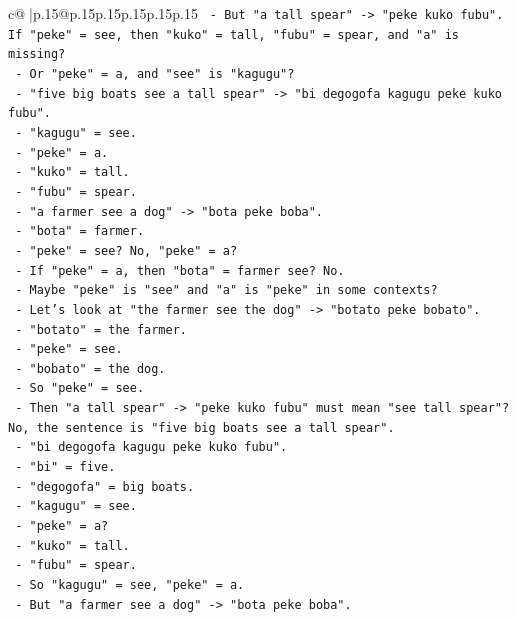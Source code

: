 \documentclass{article}
\begin{document}
{\begin{supertabular}{c@{$\;$}|p{.15\linewidth}@{}p{.15\linewidth}p{.15\linewidth}p{.15\linewidth}p{.15\linewidth}p{.15\linewidth}}
{{{\texttt{        {-} But "a tall spear" {-}> "peke kuko fubu". If "peke" = see, then "kuko" = tall, "fubu" = spear, and "a" is missing?} \\
\texttt{        {-} Or "peke" = a, and "see" is "kagugu"?} \\
\texttt{        {-} "five big boats see a tall spear" {-}> "bi degogofa kagugu peke kuko fubu".} \\
\texttt{        {-} "kagugu" = see.} \\
\texttt{        {-} "peke" = a.} \\
\texttt{        {-} "kuko" = tall.} \\
\texttt{        {-} "fubu" = spear.} \\
\texttt{        {-} "a farmer see a dog" {-}> "bota peke boba".} \\
\texttt{        {-} "bota" = farmer.} \\
\texttt{        {-} "peke" = see? No, "peke" = a?} \\
\texttt{        {-} If "peke" = a, then "bota" = farmer see? No.} \\
\texttt{        {-} Maybe "peke" is "see" and "a" is "peke" in some contexts?} \\
\texttt{        {-} Let's look at "the farmer see the dog" {-}> "botato peke bobato".} \\
\texttt{        {-} "botato" = the farmer.} \\
\texttt{        {-} "peke" = see.} \\
\texttt{        {-} "bobato" = the dog.} \\
\texttt{        {-} So "peke" = see.} \\
\texttt{        {-} Then "a tall spear" {-}> "peke kuko fubu" must mean "see tall spear"? No, the sentence is "five big boats see a tall spear".} \\
\texttt{        {-} "bi degogofa kagugu peke kuko fubu".} \\
\texttt{        {-} "bi" = five.} \\
\texttt{        {-} "degogofa" = big boats.} \\
\texttt{        {-} "kagugu" = see.} \\
\texttt{        {-} "peke" = a?} \\
\texttt{        {-} "kuko" = tall.} \\
\texttt{        {-} "fubu" = spear.} \\
\texttt{        {-} So "kagugu" = see, "peke" = a.} \\
\texttt{        {-} But "a farmer see a dog" {-}> "bota peke boba".} \\
}}}
\end{supertabular}}
\end{document}
